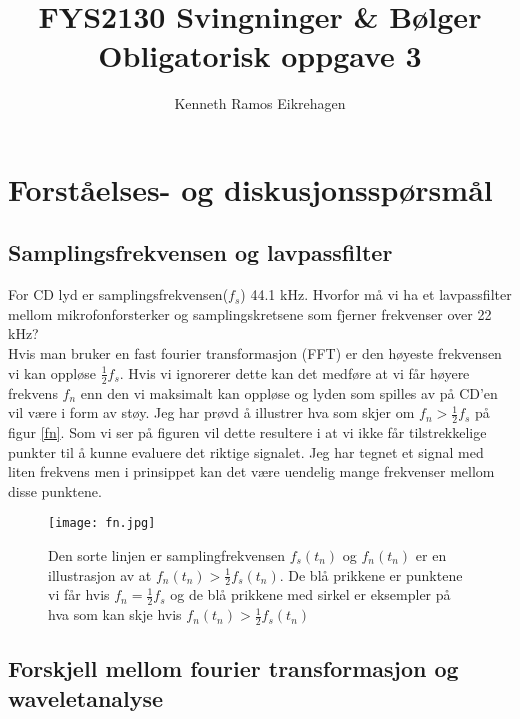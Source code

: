 \documentclass[a4paper,12pt,norsk]{article}
\title{FYS2130 Svingninger \& Bølger \\Obligatorisk oppgave 3}
\author{Kenneth Ramos Eikrehagen}
\begin{document}
\maketitle
\newpage
\tableofcontents
\newpage
\listoffigures
\newpage


\section{Forståelses- og diskusjonsspørsmål}


\subsection{Samplingsfrekvensen og lavpassfilter}

For CD lyd er samplingsfrekvensen($f_s$) 44.1 kHz. Hvorfor må vi ha et lavpassfilter mellom mikrofonforsterker og samplingskretsene som fjerner frekvenser over 22 kHz?\\

Hvis man bruker en fast fourier transformasjon (FFT) er den høyeste frekvensen vi kan oppløse $\frac{1}{2}f_s$. Hvis vi ignorerer dette kan det medføre at vi får høyere frekvens $f_n$ enn den vi maksimalt kan oppløse og lyden som spilles av på CD'en vil være i form av støy. Jeg har prøvd å illustrer hva som skjer om $f_n > \frac{1}{2}f_s$ på figur \vref{fn}. Som vi ser på figuren vil dette resultere i at vi ikke får tilstrekkelige punkter til å kunne evaluere det riktige signalet. Jeg har tegnet et signal med liten frekvens men i prinsippet kan det være uendelig mange frekvenser mellom disse punktene.

\begin{figure}[h!]
\texttt{[image: fn.jpg]} 
\caption[Samplingfrekvens]{Den sorte linjen er samplingfrekvensen $f_s(t_n)$ og $f_n(t_n)$ er en illustrasjon av at $f_n(t_n)>\frac{1}{2}f_s(t_n)$. De blå prikkene er punktene vi får hvis $f_n = \frac{1}{2}f_s$ og de blå prikkene med sirkel er eksempler på hva som kan skje hvis $f_n(t_n)>\frac{1}{2}f_s(t_n)$}
\label{fn}
\end{figure}


\subsection{Forskjell mellom fourier transformasjon og waveletanalyse}
\end{document}
